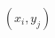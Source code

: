 \documentclass[preview]{standalone}
\begin{document}
\begin{align*}
(x_{i}, y_{j})
\end{align*}
\end{document}
